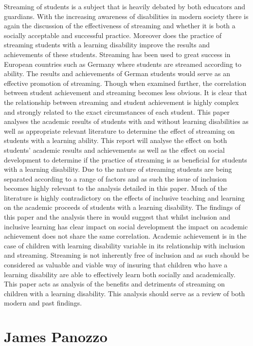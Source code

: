 \documentclass[twoside,12pt,a4paper,notitlepage]{memoir}
\begin{document}
Streaming of students is a subject that is heavily debated by both educators and guardians. With the increasing awareness of disabilities in modern society there is again the discussion of the effectiveness of streaming and whether it is both a socially acceptable and successful practice. Moreover does the practice of streaming students with a learning disability improve the results and achievements of these students. Streaming has been used to great success in European countries such as Germany where students are streamed according to ability. The results and achievements of German students would serve as an effective promotion of streaming. Though when examined further, the correlation between student achievement and streaming becomes less obvious. It is clear that the relationship between streaming and student achievement is highly complex and strongly related to the exact circumstances of each student. This paper analyses the academic results of students with and without learning disabilities as well as appropriate relevant literature to determine the effect of streaming on students with a learning ability. This report will analyse the effect on both students’ academic results and achievements as well as the effect on social development to determine if the practice of streaming is as beneficial for students with a learning disability. Due to the nature of streaming students are being separated according to a range of factors and as such the issue of inclusion becomes highly relevant to the analysis detailed in this paper. Much of the literature is highly contradictory on the effects of inclusive teaching and learning on the academic proceeds of students with a learning disability. The findings of this paper and the analysis there in would suggest that whilst inclusion and inclusive learning has clear impact on social development the impact on academic achievement does not share the same correlation. Academic achievement is in the case of children with learning disability variable in its relationship with inclusion and streaming. Streaming is not inherently free of inclusion and as such should be considered as valuable and viable way of insuring that children who have a learning disability are able to effectively learn both socially and academically. This paper acts as analysis of the benefits and detriments of streaming on children with a learning disability. This analysis should serve as a review of both modern and past findings. 

\section*{James Panozzo}
\end{document}
